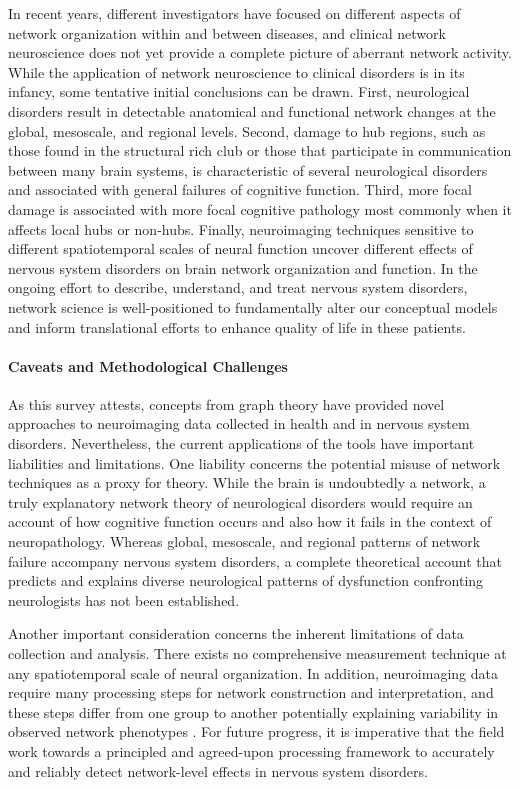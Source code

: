\documentclass[12pt]{article}
\begin{document}
In recent years, different investigators have focused on different aspects of network organization within and between diseases, and clinical network neuroscience does not yet provide a complete picture of aberrant network activity. While the application of network neuroscience to clinical disorders is in its infancy, some tentative initial conclusions can be drawn. First, neurological disorders result in detectable anatomical and functional network changes at the global, mesoscale, and regional levels. Second, damage to hub regions, such as those found in the structural rich club or those that participate in communication between many brain systems, is characteristic of several neurological disorders and associated with general failures of cognitive function. Third, more focal damage is associated with more focal cognitive pathology most commonly when it affects local hubs or non-hubs. Finally, neuroimaging techniques sensitive to different spatiotemporal scales of neural function uncover different effects of nervous system disorders on brain network organization and function. In the ongoing effort to describe, understand, and treat nervous system disorders, network science is well-positioned to fundamentally alter our conceptual models and inform translational efforts to enhance quality of life in these patients. 

\paragraph{Caveats and Methodological Challenges}

As this survey attests, concepts from graph theory have provided novel approaches to neuroimaging data collected in health and in nervous system disorders. Nevertheless, the current applications of the tools have important liabilities and limitations. One liability concerns the potential misuse of network techniques as a proxy for theory. While the brain is undoubtedly a network, a truly explanatory network theory of neurological disorders would require an account of how cognitive function occurs and also how it fails in the context of neuropathology. Whereas global, mesoscale, and regional patterns of network failure accompany nervous system disorders, a complete theoretical account that predicts and explains diverse neurological patterns of dysfunction confronting neurologists has not been established. 

Another important consideration concerns the inherent limitations of data collection and analysis. There exists no comprehensive measurement technique at any spatiotemporal scale of neural organization. In addition, neuroimaging data require many processing steps for network construction and interpretation, and these steps differ from one group to another potentially explaining variability in observed network phenotypes \cite{Stam2014}. For future progress, it is imperative that the field work towards a principled and agreed-upon processing framework to accurately and reliably detect network-level effects in nervous system disorders.
\end{document}

